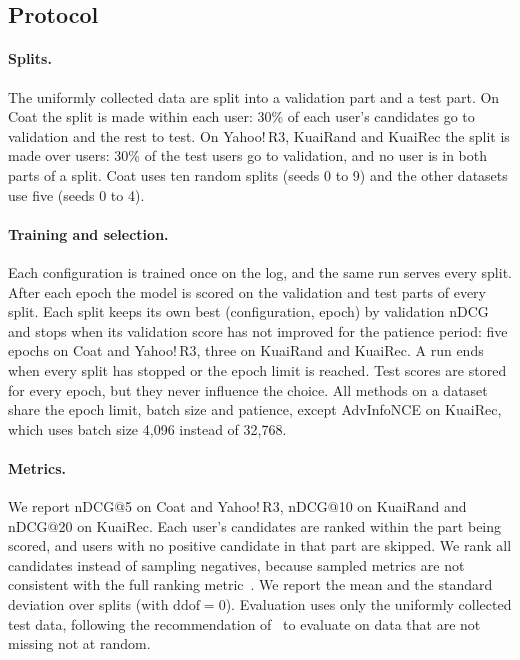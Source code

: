 \subsection{Protocol}\label{sec:protocol}

\paragraph{Splits.}
The uniformly collected data are split into a validation part and a test part. On Coat the split is
made within each user: 30\% of each user's candidates go to validation and the rest to test. On
Yahoo!\,R3, KuaiRand and KuaiRec the split is made over users: 30\% of the test users go to
validation, and no user is in both parts of a split. Coat uses ten random splits (seeds 0 to 9) and
the other datasets use five (seeds 0 to 4).

\paragraph{Training and selection.}
Each configuration is trained once on the log, and the same run serves every split. After each epoch
the model is scored on the validation and test parts of every split. Each split keeps its own best
(configuration, epoch) by validation nDCG and stops when its validation score has not improved for
the patience period: five epochs on Coat and Yahoo!\,R3, three on KuaiRand and KuaiRec. A run ends
when every split has stopped or the epoch limit is reached. Test scores are stored for every epoch,
but they never influence the choice. All methods on a dataset share the epoch limit, batch size and
patience, except AdvInfoNCE on KuaiRec, which uses batch size 4{,}096 instead of 32{,}768.

\paragraph{Metrics.}
We report nDCG@5 on Coat and Yahoo!\,R3, nDCG@10 on KuaiRand and nDCG@20 on KuaiRec. Each user's
candidates are ranked within the part being scored, and users with no positive candidate in that part
are skipped. We rank all candidates instead of sampling negatives, because sampled metrics are not
consistent with the full ranking metric~\citep{krichene2020sampled}. We report the mean and the
standard deviation over splits (with $\mathrm{ddof}=0$). Evaluation uses only the uniformly collected
test data, following the recommendation of~\citet{steck2010mnar} to evaluate on data that are not
missing not at random.

